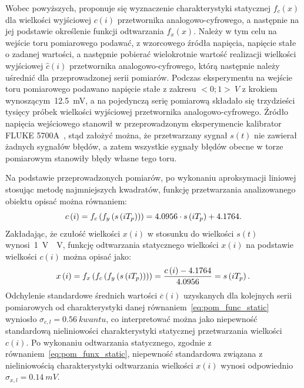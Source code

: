 Wobec powyższych, proponuje się wyznaczenie charakterystyki statycznej $f_{c}(x)$ dla wielkości wyjściowej $c(i)$ przetwornika analogowo-cyfrowego, a następnie na jej podstawie określenie funkcji odtwarzania $f_{x}(x)$. Należy w tym celu na wejście toru pomiarowego podawać, z wzorcowego źródła napięcia, napięcie stałe o zadanej wartości, a następnie pobierać wielokrotnie wartość realizacji wielkości wyjściowej $\hat{c}(i)$ przetwornika analogowo-cyfrowego, którą następnie należy uśrednić dla przeprowadzonej serii pomiarów. Podczas eksperymentu na wejście toru pomiarowego podawano napięcie stałe z zakresu $<0;1>~\unit{V}$ z krokiem wynoszącym~\qty{12.5}{mV}, a na pojedynczą serię pomiarową składało się trzydzieści tysięcy próbek wielkości wyjściowej przetwornika analogowo-cyfrowego. Źródło napięcia wejściowego stanowił w przeprowadzonym eksperymencie kalibrator FLUKE 5700A~\cite{fluke_manual}, stąd założyć można, że przetwarzany sygnał $s(t)$ nie zawierał żadnych sygnałów błędów, a zatem wszystkie sygnały błędów obecne w torze pomiarowym stanowiły błędy własne tego toru.

Na podstawie przeprowadzonych pomiarów, po wykonaniu aproksymacji liniowej stosując metodę najmniejszych kwadratów, funkcję przetwarzania analizowanego obiektu opisać można równaniem:
\begin{equation}
c \left(i\right) = f_{c} \left(f_{y} \left(s \left(iT_{p}\right)\right)\right) = 4.0956 \cdot s \left(iT_{p}\right) + 4.1764 \label{eq:pom_func_static}.
\end{equation}
Zakładając, że czułość wielkości $x(i)$ w stosunku do wielkości $s(t)$ wynosi~\qty{1}{V \per V}, funkcję odtwarzania statycznego wielkości $x(i)$ na podstawie wielkości $c(i)$ można opisać jako:
\begin{equation}
x \left(i\right) = f_{x} \left(f_{c} \left(f_{y} \left(s \left(iT_{p}\right)\right)\right)\right) = \frac{c \left(i\right) - 4.1764}{4.0956} = s \left(iT_{p}\right) \label{eq:pom_funx_static}.
\end{equation}
Odchylenie standardowe średnich wartości $\overline{c}(i)$ uzyskanych dla kolejnych serii pomiarowych od charakterystyki danej równaniem~\eqref{eq:pom_func_static} wyniosło $\sigma_{c,l} = \qty{0.56}{kwantu}$, co interpretować można jako niepewność standardową nieliniowości charakterystyki statycznej przetwarzania wielkości $c(i)$. Po wykonaniu odtwarzania statycznego, zgodnie z równaniem~\eqref{eq:pom_funx_static}, niepewność standardowa związana z nieliniowością charakterystyki odtwarzania wielkości $x(i)$ wynosi odpowiednio $\sigma_{x,l} = \qty{0.14}{mV}$.

